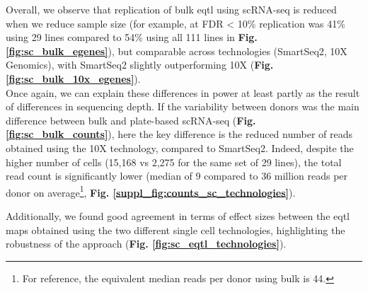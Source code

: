 Overall, we observe that replication of bulk \gls{eqtl} using scRNA-seq is reduced when we reduce sample size (for example, at FDR < 10\% replication was 41\% using 29 lines compared to 54\% using all 111 lines in \textbf{Fig. \ref{fig:sc_bulk_egenes}}), but comparable across technologies (SmartSeq2, 10X Genomics), with SmartSeq2 slightly outperforming 10X (\textbf{Fig. \ref{fig:sc_bulk_10x_egenes}}).
\\

Once again, we can explain these differences in power at least partly as the result of differences in sequencing depth.
If the variability between donors was the main difference between bulk and plate-based scRNA-seq (\textbf{Fig. \ref{fig:sc_bulk_counts}}), here the key difference is the reduced number of reads obtained using the 10X technology, compared to SmartSeq2.
Indeed, despite the higher number of cells (15,168 vs 2,275 for the same set of 29 lines), the total read count is significantly lower (median of 9 compared to 36 million reads per donor on average\footnote{For reference, the equivalent median reads per donor using bulk is 44.}, \textbf{Fig. \ref{suppl_fig:counts_sc_technologies}}).

\newpage

Additionally, we found good agreement in terms of effect sizes between the \gls{eqtl} maps obtained using the two different single cell technologies, highlighting the robustness of the approach (\textbf{Fig. \ref{fig:sc_eqtl_technologies}}). \\


